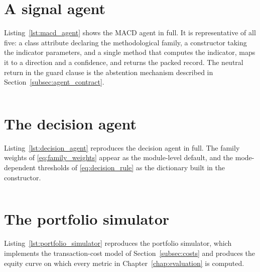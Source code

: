 \section{A signal agent}\label{app:signal_agent}

Listing~\ref{lst:macd_agent} shows the MACD agent in full. It is representative of all five: a class attribute declaring the methodological family, a constructor taking the indicator parameters, and a single method that computes the indicator, maps it to a direction and a confidence, and returns the packed record. The neutral return in the guard clause is the abstention mechanism described in Section~\ref{subsec:agent_contract}.

\begin{center}
  \captionsetup{type=listing}
  \label{lst:macd_agent}
  \inputminted[linenos, frame=single, breaklines, fontsize=\footnotesize]{python}{other/MACDAgent.py}
\end{center}

\section{The decision agent}\label{app:decision_agent}

Listing~\ref{lst:decision_agent} reproduces the decision agent in full. The family weights of \eqref{eq:family_weights} appear as the module-level default, and the mode-dependent thresholds of \eqref{eq:decision_rule} as the dictionary built in the constructor.

\begin{center}
  \captionsetup{type=listing}
  \label{lst:decision_agent}
  \inputminted[linenos, frame=single, breaklines, fontsize=\footnotesize]{python}{other/DecisionAgent.py}
\end{center}

\section{The portfolio simulator}\label{app:portfolio_simulator}

Listing~\ref{lst:portfolio_simulator} reproduces the portfolio simulator, which implements the transaction-cost model of Section~\ref{subsec:costs} and produces the equity curve on which every metric in Chapter~\ref{chap:evaluation} is computed.

\begin{center}
  \captionsetup{type=listing}
  \label{lst:portfolio_simulator}
  \inputminted[linenos, frame=single, breaklines, fontsize=\footnotesize]{python}{other/PortfolioSimulator.py}
\end{center}
